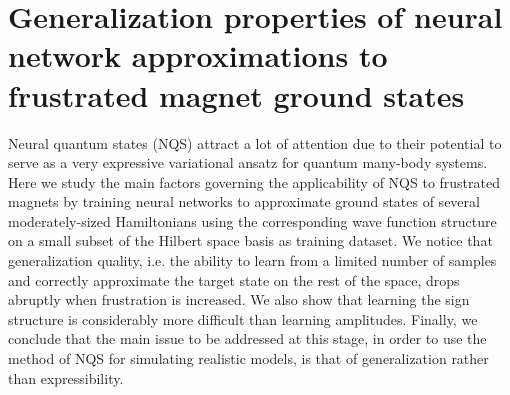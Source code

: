 \openleft%
\chapter[Generalization properties of neural network approximations to frustrated magnet ground states][Generalization properties of NQS]{Generalization properties of neural network approximations to frustrated magnet ground states}\label{ch:nc20}

{\small Neural quantum states (NQS) attract a lot of attention due to their potential to serve as a very expressive variational ansatz for quantum many-body systems. Here we study the main factors governing the applicability of NQS to frustrated magnets by training neural networks to approximate ground states of several moderately-sized Hamiltonians using the corresponding wave function structure on a small subset of the Hilbert space basis as training dataset. We notice that generalization quality, i.e. the ability to learn from a limited number of samples and correctly approximate the target state on the rest of the space, drops abruptly when frustration is increased. We also show that learning the sign structure is considerably more difficult than learning amplitudes. Finally, we conclude that the main issue to be addressed at this stage, in order to use the method of NQS for simulating realistic models, is that of generalization rather than expressibility.}

\clearpage



